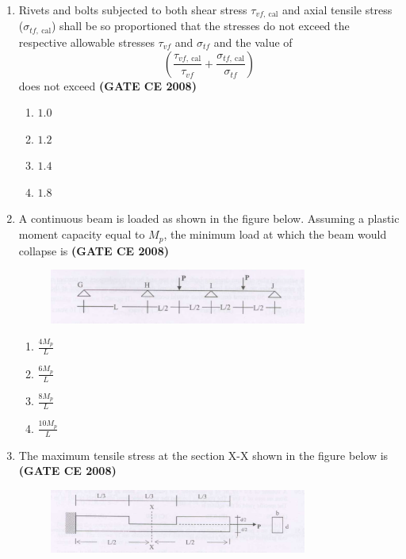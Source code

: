 \documentclass[journal]{IEEEtran}
\begin{document}
\begin{enumerate}
\item Rivets and bolts subjected to both shear stress $\tau_{vf,\ \text{cal}}$ and axial tensile stress ($\sigma_{tf,\ \text{cal}}$) shall be so proportioned that the stresses do not exceed the respective allowable stresses $\tau_{vf}$ and $\sigma_{tf}$ and the value of
\[
\left( \frac{\tau_{vf,\ \text{cal}}}{\tau_{vf}} + \frac{\sigma_{tf,\ \text{cal}}}{\sigma_{tf}} \right)
\]
does not exceed \textbf{(GATE CE 2008)}

\begin{enumerate}
\item $1.0$
\item $1.2$
\item $1.4$
\item $1.8$
\end{enumerate}

\item A continuous beam is loaded as shown in the figure below. Assuming a plastic moment capacity equal to $M_p$, the minimum load at which the beam would collapse is \textbf{(GATE CE 2008)}

\begin{figure}[h]
    \centering
    \includegraphics[width=0.8\textwidth]{image1.png} 

\end{figure}
\begin{multicols}{2}

\begin{enumerate}
\item $\frac{4M_p}{L}$
\vspace{0.1cm}
\item $\frac{6M_p}{L}$
\item $\frac{8M_p}{L}$
\vspace{0.1cm}
\item $\frac{10M_p}{L}$
\end{enumerate}     
\end{multicols}

\item The maximum tensile stress at the section X-X shown in the figure below is \textbf{(GATE CE 2008)}

\begin{figure}[h]
    \centering
    \includegraphics[width=0.8\textwidth]{image2.png} 


\end{figure}
\end{enumerate}
\end{document}
